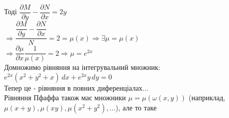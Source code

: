 \documentclass[a4paper, 14pt]{extarticle}
\def\bigline{\vspace{5mm}\\}
\begin{document}
Тоді $\dfrac{\partial M}{\partial y} - \dfrac{\partial N}{\partial x} = 2y$\\
$\Rightarrow \dfrac{\dfrac{\partial M}{\partial y} - \dfrac{\partial N}{\partial x}}{N} = 2 = \mu(x) \Rightarrow \exists \mu = \mu(x)$\\
$\Rightarrow \dfrac{\partial \mu}{\partial x} \dfrac{1}{\mu (x)} = 2 \Rightarrow \mu = e^{2x}$\\
Домножимо рівняння на інтегрувальний множник:\\
$e^{2x}(x^2+y^2+x)\,dx + e^{2x}y\,dy = 0$\\
Тепер це - рівняння в повних диференціалах...
\bigline
Рівняння Пфаффа також має множники $\mu = \mu(\omega(x,y))$ (наприклад, \\ $\mu(x+y), \mu(xy), \mu(x^2+y^2),\dots$), але то таке
\bigline
\end{document}
